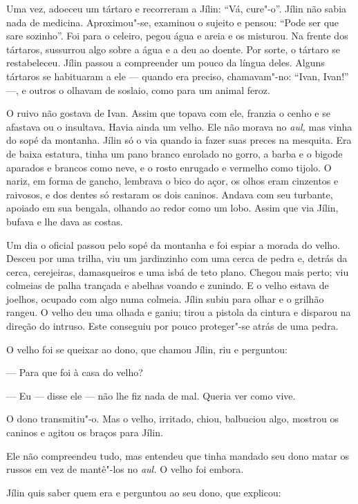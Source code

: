 Uma vez, adoeceu um tártaro e recorreram a Jílin: ``Vá, cure"-o''. Jílin
não sabia nada de medicina. Aproximou"-se, examinou o sujeito e pensou:
``Pode ser que sare sozinho''. Foi para o celeiro, pegou água e areia e
os misturou. Na frente dos tártaros, sussurrou algo sobre a água e a deu
ao doente. Por sorte, o tártaro se restabeleceu. Jílin passou a
compreender um pouco da língua deles. Alguns tártaros se habituaram a
ele --- quando era preciso, chamavam"-no: ``Ivan, Ivan!'' ---, e outros o
olhavam de soslaio, como para um animal feroz.

O ruivo não gostava de Ivan. Assim que topava com ele, franzia o cenho e
se afastava ou o insultava. Havia ainda um velho. Ele não morava no
\emph{aul,} mas vinha do sopé da montanha. Jílin só o via quando ia
fazer suas preces na mesquita. Era de baixa estatura, tinha um pano
branco enrolado no gorro, a barba e o bigode aparados e brancos como
neve, e o rosto enrugado e vermelho como tijolo. O nariz, em forma de
gancho, lembrava o bico do açor, os olhos eram cinzentos e raivosos, e
dos dentes só restaram os dois caninos. Andava com seu turbante, apoiado
em sua bengala, olhando ao redor como um lobo. Assim que via Jílin,
bufava e lhe dava as costas.

Um dia o oficial passou pelo sopé da montanha e foi espiar a morada do
velho. Desceu por uma trilha, viu um jardinzinho com uma cerca de pedra
e, detrás da cerca, cerejeiras, damasqueiros e uma isbá de teto plano.
Chegou mais perto; viu colmeias de palha trançada e abelhas voando e
zunindo. E o velho estava de joelhos, ocupado com algo numa colmeia.
Jílin subiu para olhar e o grilhão rangeu. O velho deu uma olhada e
ganiu; tirou a pistola da cintura e disparou na direção do intruso. Este
conseguiu por pouco proteger"-se atrás de uma pedra.

O velho foi se queixar ao dono, que chamou Jílin, riu e perguntou:

--- Para que foi à casa do velho?

--- Eu --- disse ele --- não lhe fiz nada de mal. Queria ver como vive.

O dono transmitiu"-o. Mas o velho, irritado, chiou, balbuciou algo,
mostrou os caninos e agitou os braços para Jílin.

Ele não compreendeu tudo, mas entendeu que tinha mandado seu dono matar os
russos em vez de mantê"-los no \emph{aul.} O velho foi embora.

Jílin quis saber quem era e perguntou ao seu dono, que explicou:

